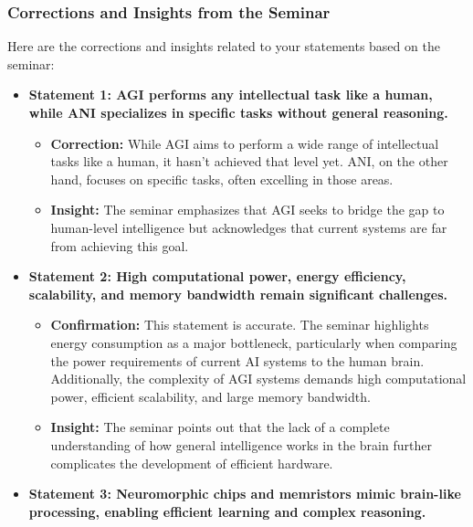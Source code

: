 \documentclass[
]{article}
\author{}
\date{}
\begin{document}
\subsubsection{Corrections and Insights from the
Seminar}\label{corrections-and-insights-from-the-seminar}

Here are the corrections and insights related to your statements based
on the seminar:

\begin{itemize}
\item
  \textbf{Statement 1: AGI performs any intellectual task like a human,
  while ANI specializes in specific tasks without general reasoning.}

  \begin{itemize}
  
  \item
    \textbf{Correction:} While AGI aims to perform a wide range of
    intellectual tasks like a human, it hasn't achieved that level yet.
    ANI, on the other hand, focuses on specific tasks, often excelling
    in those areas.
  \item
    \textbf{Insight:} The seminar emphasizes that AGI seeks to bridge
    the gap to human-level intelligence but acknowledges that current
    systems are far from achieving this goal.
  \end{itemize}
\item
  \textbf{Statement 2: High computational power, energy efficiency,
  scalability, and memory bandwidth remain significant challenges.}

  \begin{itemize}
  
  \item
    \textbf{Confirmation:} This statement is accurate. The seminar
    highlights energy consumption as a major bottleneck, particularly
    when comparing the power requirements of current AI systems to the
    human brain. Additionally, the complexity of AGI systems demands
    high computational power, efficient scalability, and large memory
    bandwidth.
  \item
    \textbf{Insight:} The seminar points out that the lack of a complete
    understanding of how general intelligence works in the brain further
    complicates the development of efficient hardware.
  \end{itemize}
\item
  \textbf{Statement 3: Neuromorphic chips and memristors mimic
  brain-like processing, enabling efficient learning and complex
  reasoning.}


\end{itemize}
\end{document}
